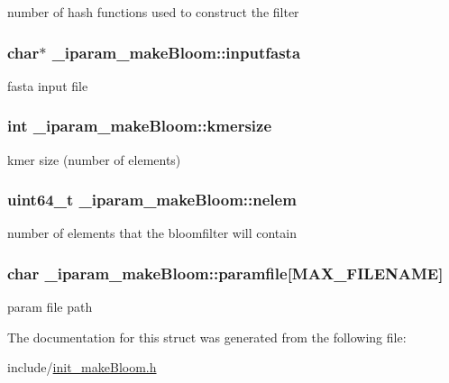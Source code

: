 number of hash functions used to construct the filter \hypertarget{struct__iparam__makeBloom_aaefb007647f548e8f3ffcb5fc83b7040}{
\subsubsection[{inputfasta}]{\setlength{\rightskip}{0pt plus 5cm}char$\ast$ \+\_\+iparam\+\_\+make\+Bloom\+::inputfasta}}\label{struct__iparam__makeBloom_aaefb007647f548e8f3ffcb5fc83b7040}
fasta input file \hypertarget{struct__iparam__makeBloom_a6f25cccf64d8ccdad252dcc1a99f0015}{
\subsubsection[{kmersize}]{\setlength{\rightskip}{0pt plus 5cm}int \+\_\+iparam\+\_\+make\+Bloom\+::kmersize}}\label{struct__iparam__makeBloom_a6f25cccf64d8ccdad252dcc1a99f0015}
kmer size (number of elements) \hypertarget{struct__iparam__makeBloom_aad19a452126dca34f78bb961dc4cf233}{
\subsubsection[{nelem}]{\setlength{\rightskip}{0pt plus 5cm}uint64\+\_\+t \+\_\+iparam\+\_\+make\+Bloom\+::nelem}}\label{struct__iparam__makeBloom_aad19a452126dca34f78bb961dc4cf233}
number of elements that the bloomfilter will contain \hypertarget{struct__iparam__makeBloom_a8cf429229a99acfab0ce48046f42dfac}{
\subsubsection[{paramfile}]{\setlength{\rightskip}{0pt plus 5cm}char \+\_\+iparam\+\_\+make\+Bloom\+::paramfile\mbox{[}{\bf M\+A\+X\+\_\+\+F\+I\+L\+E\+N\+A\+M\+E}\mbox{]}}}\label{struct__iparam__makeBloom_a8cf429229a99acfab0ce48046f42dfac}
param file path 

The documentation for this struct was generated from the following file\+:\begin{DoxyCompactItemize}
\item 
include/\hyperlink{init__makeBloom_8h}{init\+\_\+make\+Bloom.\+h}\end{DoxyCompactItemize}

